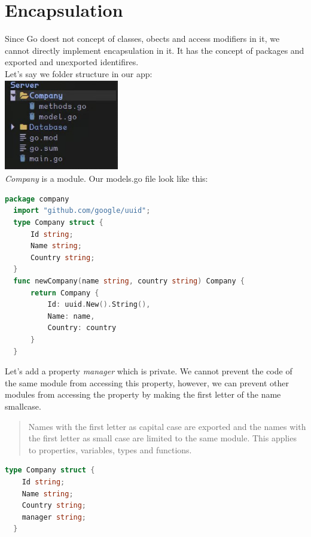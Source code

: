 \documentclass[12pt,a4paper]{report}
\begin{document}
\section*{Encapsulation}
Since Go doest not concept of classes, obects and access modifiers in it, we
cannot directly implement encapsulation in it. It has the concept of packages
and exported and unexported identifires.\\
Let's say we folder structure in our app:\\
\includegraphics[width=5cm, height=4cm]{server.jpg}\\
\textit{Company} is a module. Our models.go file look like this:\\
\begin{lstlisting}[language=Go]
  package company
  import "github.com/google/uuid";
  type Company struct {
      Id string;
      Name string;
      Country string;
  }
  func newCompany(name string, country string) Company {
      return Company {
          Id: uuid.New().String(),
          Name: name,
          Country: country
      }
  }
\end{lstlisting}
Let's add a property \textit{manager} which is private. We cannot prevent the code of
the same module from accessing this property, however, we can prevent
other modules from accessing the property by making the first letter of the
name smallcase.
\begin{quotation}
  Names with the first letter as capital case are exported and the names
  with the first letter as small case are limited to the same module. This
  applies to properties, variables, types and functions. 
\end{quotation}
\break
\begin{lstlisting}[language=Go]
  type Company struct {
    Id string;
    Name string;
    Country string;
    manager string;
  }
\end{lstlisting}
\end{document}
